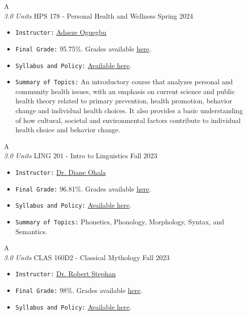 \cventry
{A \\ \small{\textit{3.0 Units}}}
{HPS 178 - Personal Health and Wellness}
{Spring 2024}
{}
{}
{
  \begin{itemize}
    \item \texttt{Instructor:} \href{}{Adaeze Oguegbu}
    \item \texttt{Final Grade:} 95.75\%. Grades available \href{https://mhrezaei.com/assets/cv/courses/Spring2024/HPS178/Grades.pdf}{here}.
    \item \texttt{Syllabus and Policy:} \href{https://mhrezaei.com/assets/cv/courses/Spring2024/HPS178/Syllabus.pdf}{Available here}.
    \item \texttt{Summary of Topics:} An introductory course that analyzes personal and community health issues,
    with an emphasis on current science and public health theory related to primary prevention, health
    promotion, behavior change and individual health choices. It also provides a basic understanding of
    how cultural, societal and environmental factors contribute to individual health choice and behavior
    change.
  \end{itemize}
}



\cventry
{A \\ \small{\textit{3.0 Units}}}
{LING 201 - Intro to Linguistics}
{Fall 2023}
{}
{}
{
  \begin{itemize}
    \item \texttt{Instructor:} \href{https://profiles.arizona.edu/person/ohalad}{Dr. Diane Ohala}
    \item \texttt{Final Grade:} 96.81\%. Grades available \href{https://mhrezaei.com/assets/cv/courses/Fall2023/LING201/Grades.pdf}{here}.
    \item \texttt{Syllabus and Policy:} \href{https://mhrezaei.com/assets/cv/courses/Fall2023/LING201/Syllabus.pdf}{Available here}.
    \item \texttt{Summary of Topics:} Phonetics, Phonology, Morphology, Syntax, and Semantics.
  \end{itemize}
}

\cventry
{A \\ \small{\textit{3.0 Units}}}
{CLAS 160D2 - Classical Mythology}
{Fall 2023}
{}
{}
{
  \begin{itemize}
    \item \texttt{Instructor:} \href{https://classics.arizona.edu/people/rstephan}{Dr. Robert Stephan}
    \item \texttt{Final Grade:} 98\%. Grades available \href{https://mhrezaei.com/assets/cv/courses/Fall2023/CLAS160D2/Grades.pdf}{here}.
    \item \texttt{Syllabus and Policy:} \href{https://mhrezaei.com/assets/cv/courses/Fall2023/CLAS160D2/Syllabus.pdf}{Available here}.
  \end{itemize}
}

